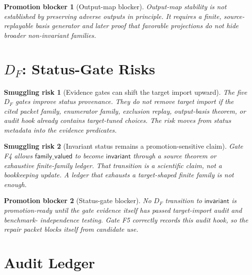 \documentclass[11pt]{article}
\newtheorem{smugglingrisk}{Smuggling risk}
\newtheorem{promotionblocker}{Promotion blocker}
\begin{document}
\begin{promotionblocker}[Output-map blocker]
Output-map stability is not established by preserving adverse outputs in
principle. It requires a finite, source-replayable basis generator and later
proof that favorable projections do not hide broader non-invariant families.
\end{promotionblocker}

\section{\texorpdfstring{\(D_F\)}{DF}: Status-Gate Risks}

\begin{smugglingrisk}[Evidence gates can shift the target import upward]
The five \(D_F\) gates improve status provenance. They do not remove target
import if the cited packet family, enumerator family, exclusion replay,
output-basis theorem, or audit hook already contains target-tuned choices.
The risk moves from status metadata into the evidence predicates.
\end{smugglingrisk}

\begin{smugglingrisk}[Invariant status remains a promotion-sensitive claim]
Gate F4 allows \(\mathsf{family\_valued}\) to become
\(\mathsf{invariant}\) through a source theorem or exhaustive finite-family
ledger. That transition is a scientific claim, not a bookkeeping update. A
ledger that exhausts a target-shaped finite family is not enough.
\end{smugglingrisk}

\begin{promotionblocker}[Status-gate blocker]
No \(D_F\) transition to \(\mathsf{invariant}\) is promotion-ready until the
gate evidence itself has passed target-import audit and benchmark-
independence testing. Gate F5 correctly records this audit hook, so the
repair packet blocks itself from candidate use.
\end{promotionblocker}

\section{Audit Ledger}
\end{document}
